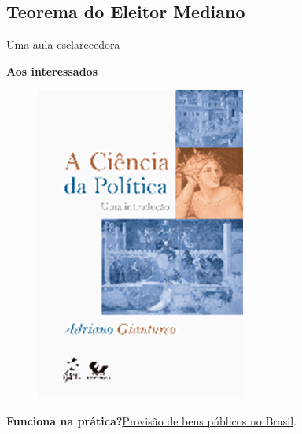 \documentclass[a4paper,12pt]{article}[abntex2]
\begin{document}
\subsection{\textbf{Teorema do Eleitor Mediano}}
\href{https://www.facebook.com/429608184068695/videos/389419731878556/UzpfSTEwNjE1NTYyMDY6MTAyMTYxMjM5NDU2NjU2NzY/}{Uma aula esclarecedora}

\textbf{Aos interessados}
\begin{figure}[H]
    \centering
    \includegraphics[width=0.7\linewidth]{Imagens/a15i2.png}
\end{figure}

\textbf{Funciona na prática?}\href{http://www.scielo.br/scielo.php?pid=S0034-71402006000300005&script=sci_arttext}{Provisão de bens públicos no Brasil}.
\end{document}
